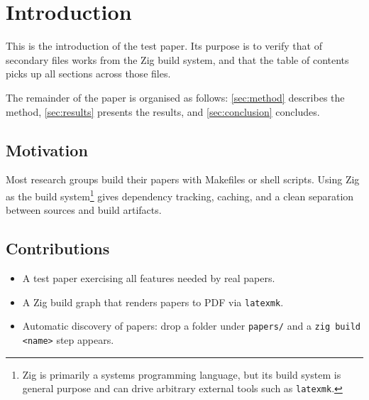 \section{Introduction}
\label{sec:introduction}

This is the introduction of the test paper. Its purpose is to verify that
\verb|| of secondary files works from the Zig build system, and that the
table of contents picks up all sections across those files.

The remainder of the paper is organised as follows:
\cref{sec:method} describes the method,
\cref{sec:results} presents the results, and
\cref{sec:conclusion} concludes.

\subsection{Motivation}
\label{sec:motivation}

Most research groups build their papers with Makefiles or shell scripts. Using
Zig as the build system\footnote{Zig is primarily a systems programming
language, but its build system is general purpose and can drive arbitrary
external tools such as \texttt{latexmk}.} gives dependency tracking, caching,
and a clean separation between sources and build artifacts.

\subsection{Contributions}
\label{sec:contributions}

\begin{itemize}
  \item A test paper exercising all features needed by real papers.
  \item A Zig build graph that renders papers to PDF via \texttt{latexmk}.
  \item Automatic discovery of papers: drop a folder under \texttt{papers/}
        and a \texttt{zig build <name>} step appears.
\end{itemize}
